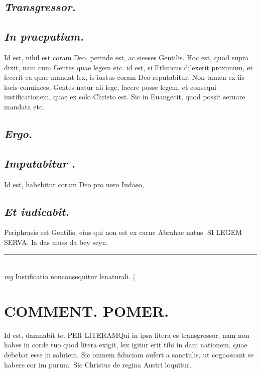 \documentclass{article}
\begin{document}
\begin{pages}
\subsection*{\textit{Transgressor. }}
{}
\subsection*{\textit{In praeputium. }}\pstart Id est, nihil est coram Deo, perinde est, ac siesses Gentilis.  \pend\pstart Hoc est, quod supra dixit, nam cum Gentes quae legem etc. id est, si Ethnicus dilexerit proximum, et fecerit ea quae mandat lex, is iustus coram Deo reputabitur. Non tamen ex iis locis conuinces, Gentes natur ali lege, facere posse legem, et consequi iustificationem, quae ex solo Christo est. Sic in Euangecit, quod possit seruare mandata etc.   \pend
{}
{}
\subsection*{\textit{Ergo. }}
{}
\subsection*{\textit{Imputabitur . }}\pstart Id est, habebitur coram Deo pro uero Iudaeo,  \pend
{}
{}
\subsection*{\textit{Et iudicabit. }}\pstart Periphrasis est Gentilis, eius qui non est ex carne Abrahae natus. SI LEGEM SERVA.  Ia das muss da bey seyn.   \pend
\vspace{0.5cm}\noindent
\vspace{0.2cm}\rule{1cm}{0.2pt}\\ 
\hspace{0.2cm}\textit{mg}
\footnotesize Iustificatio nonconsequitur lenaturali. 
\normalsize| 
\section*{COMMENT. POMER.  }\pstart Id est, damnabit te. PER LITERAMQui in ipsa litera es transgressor, nam non habes in corde tuo quod litera exigit, lex igitur erit tibi in dam nationem, quae debebat esse in salutem. Sic omnem fiduciam aufert a sanctulis, ut cognoscant se habere cor im purum. Sic Christus de regina Austri loquitur.  \pend
{}
{}

\end{pages}
\end{document}
